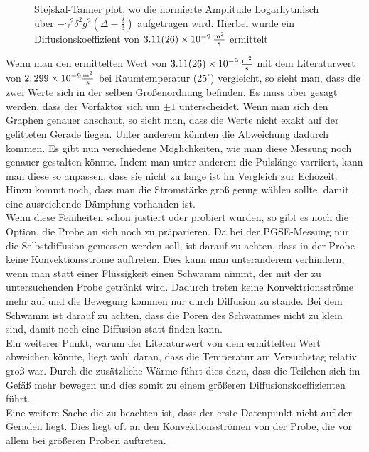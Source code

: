 \begin{figure}[H]
    \centering
    
    \caption[Bestimmung des selbst Diffusionskoeffizienten mithilfe von dem Stejskal-Tanner plot]{Stejskal-Tanner plot, wo die normierte Amplitude Logarhytmisch über $-\gamma^2\delta^2g^2\left(\Delta-\frac{\delta}{3}\right)$ aufgetragen wird. Hierbei wurde ein Diffusionskoeffizient von $\SI{3,11(26)e-9}{\frac{\m^2}{s}}$ ermittelt}
\end{figure}
 Wenn man den ermittelten Wert von $\SI{3,11(26)e-9}{\frac{\m^2}{s}}$ mit dem Literaturwert von $2,299 \times 10^{-9}\si{\frac{\m^2}{\s}}$ bei Raumtemperatur ($25^{\circ}$) vergleicht\cite{Diff}, so sieht man, dass die zwei Werte sich in der selben Größenordnung befinden. Es muss aber gesagt werden, dass der Vorfaktor sich um $\pm 1$ unterscheidet. Wenn man sich den Graphen  genauer anschaut, so sieht man, dass die Werte nicht exakt auf der gefitteten Gerade liegen. Unter anderem könnten die Abweichung dadurch kommen. 
Es gibt nun verschiedene Möglichkeiten, wie man diese Messung noch genauer gestalten könnte. Indem man unter anderem die Pulslänge varriiert, kann man diese so anpassen, dass sie nicht zu lange ist im Vergleich zur Echozeit. Hinzu kommt noch, dass man die Stromstärke groß genug wählen sollte, damit eine ausreichende Dämpfung vorhanden ist.\\
Wenn diese Feinheiten schon justiert oder probiert wurden, so gibt es noch die Option, die Probe an sich noch zu präparieren. Da bei der PGSE-Messung nur die Selbstdiffusion gemessen werden soll, ist darauf zu achten, dass in der Probe keine Konvektionsströme auftreten. Dies kann man unteranderem verhindern, wenn man statt einer Flüssigkeit einen Schwamm nimmt, der mit der zu untersuchenden Probe getränkt wird. Dadurch treten keine Konvektrionsströme mehr auf und die Bewegung kommen nur durch Diffusion zu stande. Bei dem Schwamm ist darauf zu achten, dass die Poren des Schwammes nicht zu klein sind, damit noch eine Diffusion statt finden kann.\\
Ein weiterer Punkt, warum der Literaturwert von dem ermittelten Wert abweichen könnte, liegt wohl daran, dass die Temperatur am Versuchstag relativ groß war. Durch die zusätzliche Wärme führt dies dazu, dass die Teilchen sich im Gefäß mehr bewegen und dies somit zu einem größeren Diffusionskoeffizienten führt.\\
Eine weitere Sache die zu beachten ist, dass der erste Datenpunkt nicht auf der Geraden liegt. Dies liegt oft an den Konvektionsströmen von der Probe, die vor allem bei größeren Proben auftreten.